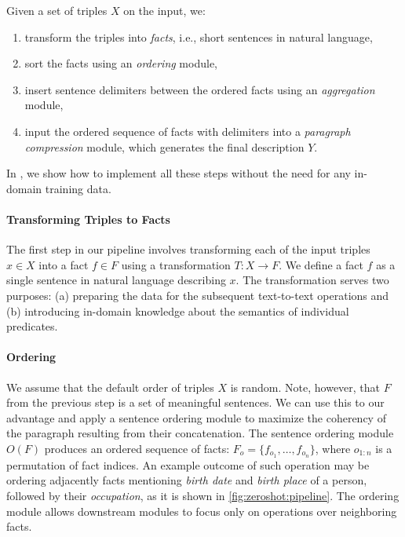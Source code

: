 Given a set of triples $X$ on the input, we:
\begin{enumerate}
    \item transform the triples into \textit{facts}, i.e., short sentences in natural language,
    \item sort the facts using an \textit{ordering} module,
    \item insert sentence delimiters between the ordered facts using an \textit{aggregation} module,
    \item input the ordered sequence of facts with delimiters into a \textit{paragraph compression} module, which generates the final description $Y$.
\end{enumerate}

In , we show how to implement all these steps without the need for any in-domain training data.

\paragraph{Transforming Triples to Facts}

The first step in our pipeline involves transforming each of the input triples $x \in X$ into a fact $f \in F$  using a transformation $T: X \rightarrow F$. We define a fact $f$ as a single sentence in natural language describing $x$.
The transformation serves two purposes: (a) preparing the data for the subsequent text-to-text operations and (b) introducing in-domain knowledge about the semantics of individual predicates.



\paragraph{Ordering} We assume that the default order of triples $X$ is random. Note, however, that $F$ from the previous step is a set of meaningful sentences. We can use this to our advantage and apply a sentence ordering module \cite{barzilay2001sentence,lapata2003probabilistic} to maximize the coherency of the paragraph resulting from their concatenation. The sentence ordering module $O(F)$ produces an ordered sequence of facts: $F_o = \{f_{o_1}, \ldots, f_{o_n}\}$, where $o_{1:n}$ is a permutation of fact indices. An example outcome of such operation may be ordering adjacently facts mentioning \textit{birth date} and \textit{birth place} of a person, followed by their \textit{occupation}, as it is shown in \autoref{fig:zeroshot:pipeline}. The ordering module allows downstream modules to focus only on operations over neighboring facts.


